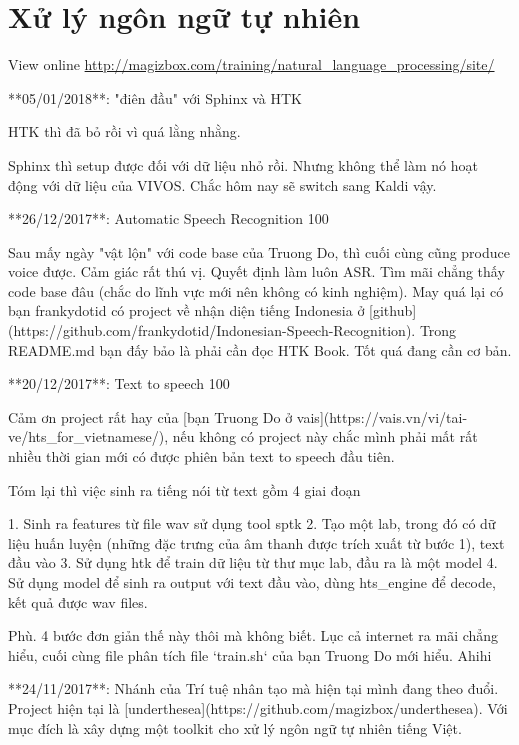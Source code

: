 \chapter{Xử lý ngôn ngữ tự nhiên}

View online \href{http://magizbox.com/training/natural_language_processing/site/}{http://magizbox.com/training/natural_language_processing/site/}

**05/01/2018**: "điên đầu" với Sphinx và HTK

HTK thì đã bỏ rồi vì quá lằng nhằng.

Sphinx thì setup được đối với dữ liệu nhỏ rồi. Nhưng không thể làm nó hoạt động với dữ liệu của VIVOS. Chắc hôm nay sẽ switch sang Kaldi vậy.

**26/12/2017**: Automatic Speech Recognition 100

Sau mấy ngày "vật lộn" với code base của Truong Do, thì cuối cùng cũng produce voice được. Cảm giác rất thú vị. Quyết định làm luôn ASR. Tìm mãi chẳng thấy code base đâu (chắc do lĩnh vực mới nên không có kinh nghiệm). May quá lại có bạn frankydotid có project về nhận diện tiếng Indonesia ở [github](https://github.com/frankydotid/Indonesian-Speech-Recognition). Trong README.md bạn đấy bảo là phải cần đọc HTK Book. Tốt quá đang cần cơ bản.

**20/12/2017**: Text to speech 100

Cảm ơn project rất hay của [bạn Truong Do ở vais](https://vais.vn/vi/tai-ve/hts_for_vietnamese/), nếu không có project này chắc mình phải mất rất nhiều thời gian mới có được phiên bản text to speech đầu tiên.

Tóm lại thì việc sinh ra tiếng nói từ text gồm 4 giai đoạn

1. Sinh ra features từ file wav sử dụng tool sptk
2. Tạo một lab, trong đó có dữ liệu huấn luyện (những đặc trưng của âm thanh được trích xuất từ bước 1), text đầu vào
3. Sử dụng htk để train dữ liệu từ thư mục lab, đầu ra là một model
4. Sử dụng model để sinh ra output với text đầu vào, dùng hts_engine để decode, kết quả được wav files.

Phù. 4 bước đơn giản thế này thôi mà không biết. Lục cả internet ra mãi chẳng hiểu, cuối cùng file phân tích file `train.sh` của bạn Truong Do mới hiểu. Ahihi

**24/11/2017**: Nhánh của Trí tuệ nhân tạo mà hiện tại mình đang theo đuổi. Project hiện tại là [underthesea](https://github.com/magizbox/underthesea). Với mục đích là xây dựng một toolkit cho xử lý ngôn ngữ tự nhiên tiếng Việt.


